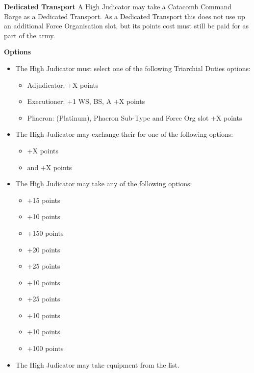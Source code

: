 \begin{minipage}[t]{0.72\textwidth}
	\vspace*{2em}
	\textbf{Dedicated Transport}
	A High Judicator may take a Catacomb Command Barge as a Dedicated Transport. As a Dedicated Transport this does not use up an additional Force Organisation slot, but its points cost must still be paid for as part of the army.
	
	\vspace*{2em}
	\textbf{Options}
	\begin{itemize}
		\item The High Judicator must select one of the following Triarchial Duties options:
		\begin{itemize}
			\item Adjudicator: \dotfill +X points
			\item Executioner: +1 WS, BS, A \dotfill +X points
			\item Phaeron:  (Platinum), Phaeron Sub-Type and Force Org slot \dotfill +X points
		\end{itemize}
		\item The High Judicator may exchange their  for one of the following options:
		\begin{itemize}			
			\item {} \dotfill +X points
			\item {} and  \dotfill +X points
		\end{itemize}
		\item The High Judicator may take any of the following options:
		\begin{itemize}
			\item {} \dotfill +15 points
			\item {} \dotfill +10 points
			\item {} \dotfill +150 points
			\item {} \dotfill +20 points
			\item {} \dotfill +25 points
			\item {} \dotfill +10 points
			\item {} \dotfill +25 points
			\item {} \dotfill +10 points
			\item {} \dotfill +10 points
			\item {} \dotfill +100 points
		\end{itemize}
		\item The High Judicator may take equipment from the  list.
	\end{itemize}
\end{minipage}


